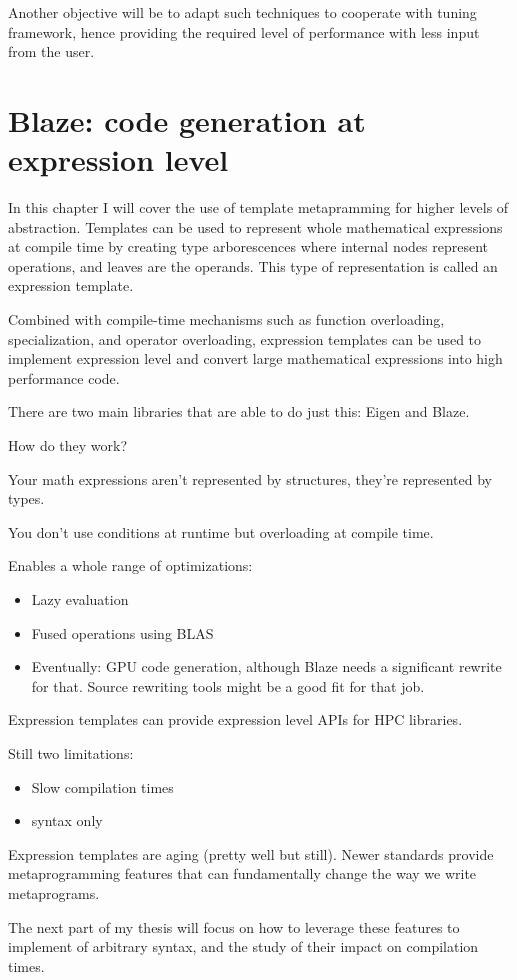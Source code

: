 \documentclass[../../main.tex]{subfiles}
\begin{document}
Another objective will be to adapt such techniques to cooperate
with tuning framework, hence providing the required level of
performance with less input from the user.

\chapter{Blaze: code generation at expression level}

In this chapter I will cover the use of template metapramming for higher levels
of abstraction. Templates can be used to represent whole mathematical
expressions at compile time by creating type arborescences where internal
nodes represent operations, and leaves are the operands. This type of
representation is called an expression template\cite{veldhuizen:1995}.

Combined with compile-time mechanisms such as function overloading,
specialization, and operator overloading, expression templates can be used to
implement expression level \dsels and convert large mathematical expressions
into high performance code.

There are two main libraries that are able to do just this: Eigen\cite{eigen}
and Blaze\cite{blazelib}.

How do they work?

Your math expressions aren't represented by structures,
they're represented by types.

You don't use conditions at runtime but overloading at compile time.

Enables a whole range of optimizations:

\begin{itemize}
\item Lazy evaluation
\item Fused operations using BLAS
\item Eventually: GPU code generation, although Blaze needs a significant
      rewrite for that. Source rewriting tools might be a good fit for that job.
\end{itemize}

Expression templates can provide expression level APIs for HPC libraries.

Still two limitations:

\begin{itemize}
\item Slow compilation times
\item \cpp syntax only
\end{itemize}

Expression templates are aging (pretty well but still).
Newer \cpp standards provide metaprogramming features that can fundamentally
change the way we write metaprograms.

The next part of my thesis will focus on how to leverage these features to
implement \dsel of arbitrary syntax, and the study of their impact on
compilation times.
\end{document}
